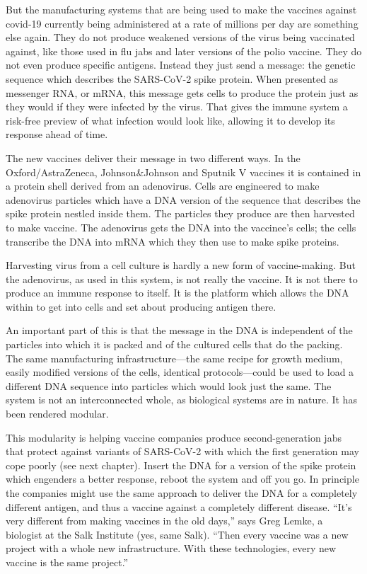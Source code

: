 \documentclass{article}
\begin{document}
But the manufacturing systems that are being used to make the vaccines against covid-19 currently being administered at a rate of millions per day are something else again. They do not produce weakened versions of the virus being vaccinated against, like those used in flu jabs and later versions of the polio vaccine. They do not even produce specific antigens. Instead they just send a message: the genetic sequence which describes the SARS-CoV-2 spike protein. When presented as messenger RNA, or mRNA, this message gets cells to produce the protein just as they would if they were infected by the virus. That gives the immune system a risk-free preview of what infection would look like, allowing it to develop its response ahead of time. 

The new vaccines deliver their message in two different ways. In the Oxford/AstraZeneca, Johnson\&Johnson and Sputnik V vaccines it is contained in a protein shell derived from an adenovirus. Cells are engineered to make adenovirus particles which have a DNA version of the sequence that describes the spike protein nestled inside them. The particles they produce are then harvested to make vaccine. The adenovirus gets the DNA into the vaccinee's cells; the cells transcribe the DNA into mRNA which they then use to make spike proteins. 

Harvesting virus from a cell culture is hardly a new form of vaccine-making. But the adenovirus, as used in this system, is not really the vaccine. It is not there to produce an immune response to itself. It is the platform which allows the DNA within to get into cells and set about producing antigen there. 

An important part of this is that the message in the DNA is independent of the particles into which it is packed and of the cultured cells that do the packing. The same manufacturing infrastructure---the same recipe for growth medium, easily modified versions of the cells, identical protocols---could be used to load a different DNA sequence into particles which would look just the same. The system is not an interconnected whole, as biological systems are in nature. It has been rendered modular. 

This modularity is helping vaccine companies produce second-generation jabs that protect against variants of SARS-CoV-2 with which the first generation may cope poorly (see next chapter). Insert the DNA for a version of the spike protein which engenders a better response, reboot the system and off you go. In principle the companies might use the same approach to deliver the DNA for a completely different antigen, and thus a vaccine against a completely different disease. ``It's very different from making vaccines in the old days,'' says Greg Lemke, a biologist at the Salk Institute (yes, same Salk). ``Then every vaccine was a new project with a whole new infrastructure. With these technologies, every new vaccine is the same project.'' 
\end{document}
